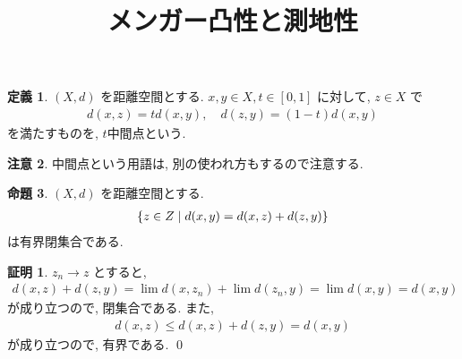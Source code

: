 \documentclass[10pt, fleqn, label-section=none]{bxjsarticle}
\title{メンガー凸性と測地性}
\date{}
\author{}
\theoremstyle{definition}
\newtheorem{dfn}{定義}[section]
\newtheorem{prop}[dfn]{命題}
\newtheorem*{pf*}{証明}
\newtheorem{remark}[dfn]{注意}
\newcommand{\cbra}[1]{\mleft\{#1\mright\}}
\renewcommand{\;}{\, ; \,}
\begin{document}
\maketitle

\section{}


\begin{dfn}$(X, d)$ を距離空間とする. $x, y \in X, t \in [0, 1]$ に対して, $z \in X$ で
\begin{align*} d(x, z) = t d(x, y), \quad d(z, y) = (1- t)d(x, y)  \end{align*}
を満たすものを, $t$中間点という. 
\end{dfn}

\begin{remark}
中間点という用語は, 別の使われ方もするので注意する. 
\end{remark}


\begin{prop}$(X, d)$ を距離空間とする. 
\begin{align*} \cbra{z \in Z  \mid d(x, y) = d(x, z) + d(z, y)          }          \end{align*}
は有界閉集合である. 
\end{prop}
\begin{pf*}
$z_n \rightarrow z$ とすると, 
\begin{align*} d(x, z) + d(z, y) = \lim d(x, z_n) + \lim d(z_n, y) = \lim d(x, y) = d(x, y)  \end{align*}
が成り立つので, 閉集合である. また, 
\begin{align*} d(x, z) \leq d(x, z) + d(z, y) = d(x, y) \end{align*}
が成り立つので, 有界である.
\qed
\end{pf*}
\end{document}

